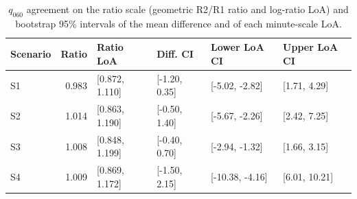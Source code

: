 \begin{table}[tb]
\centering
\caption{$q_{060}$ agreement on the ratio scale (geometric R2/R1 ratio and log-ratio LoA) and bootstrap 95\% intervals of the mean difference and of each minute-scale LoA.}
\label{tab:reliability20-agreement}
\scriptsize\setlength{\tabcolsep}{3pt}
\begin{tabular}{@{}lrllll@{}}
\toprule
Scenario & Ratio & Ratio LoA & Diff. CI & Lower LoA CI & Upper LoA CI\\\midrule
S1 & 0.983 & [0.872, 1.110] & [-1.20, 0.35] & [-5.02, -2.82] & [1.71, 4.29]\\
S2 & 1.014 & [0.863, 1.190] & [-0.50, 1.40] & [-5.67, -2.26] & [2.42, 7.25]\\
S3 & 1.008 & [0.848, 1.199] & [-0.40, 0.70] & [-2.94, -1.32] & [1.66, 3.15]\\
S4 & 1.009 & [0.869, 1.172] & [-1.50, 2.15] & [-10.38, -4.16] & [6.01, 10.21]\\
\bottomrule
\end{tabular}
\end{table}
